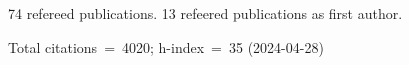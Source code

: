 74 refereed publications. 13 refeered publications as first author.

Total citations~=~4020; h-index~=~35 (2024-04-28)